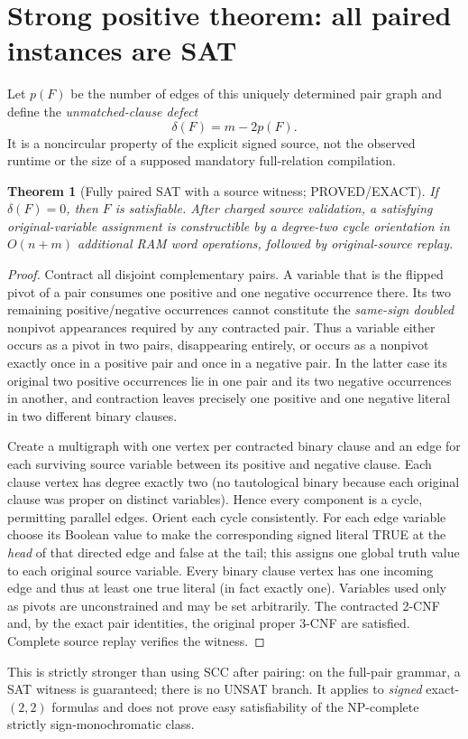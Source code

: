 \documentclass[11pt]{article}
\newtheorem{theorem}{Theorem}
\begin{document}
\section{Strong positive theorem: all paired instances are SAT}
Let $p(F)$ be the number of edges of this uniquely determined pair graph and define the \emph{unmatched-clause defect}
\[
\delta(F)=m-2p(F).
\]
It is a noncircular property of the explicit signed source, not the observed runtime or the size of a supposed mandatory full-relation compilation.
\begin{theorem}[Fully paired SAT with a source witness; PROVED/EXACT]
If $\delta(F)=0$, then $F$ is satisfiable. After charged source validation, a satisfying original-variable assignment is constructible by a degree-two cycle orientation in $O(n+m)$ additional RAM word operations, followed by original-source replay.
\end{theorem}
\begin{proof}
Contract all disjoint complementary pairs. A variable that is the flipped pivot of a pair consumes one positive and one negative occurrence there. Its two remaining positive/negative occurrences cannot constitute the \emph{same-sign doubled} nonpivot appearances required by any contracted pair. Thus a variable either occurs as a pivot in two pairs, disappearing entirely, or occurs as a nonpivot exactly once in a positive pair and once in a negative pair. In the latter case its original two positive occurrences lie in one pair and its two negative occurrences in another, and contraction leaves precisely one positive and one negative literal in two different binary clauses.
\par\noindent Create a multigraph with one vertex per contracted binary clause and an edge for each surviving source variable between its positive and negative clause. Each clause vertex has degree exactly two (no tautological binary because each original clause was proper on distinct variables). Hence every component is a cycle, permitting parallel edges. Orient each cycle consistently. For each edge variable choose its Boolean value to make the corresponding signed literal TRUE at the \emph{head} of that directed edge and false at the tail; this assigns one global truth value to each original source variable. Every binary clause vertex has one incoming edge and thus at least one true literal (in fact exactly one). Variables used only as pivots are unconstrained and may be set arbitrarily. The contracted 2-CNF and, by the exact pair identities, the original proper 3-CNF are satisfied. Complete source replay verifies the witness.
\end{proof}
\par\noindent This is strictly stronger than using SCC after pairing: on the full-pair grammar, a SAT witness is guaranteed; there is no UNSAT branch. It applies to \emph{signed} exact-$(2,2)$ formulas and does not prove easy satisfiability of the NP-complete strictly sign-monochromatic class.
\end{document}
